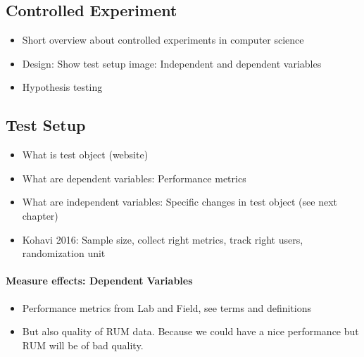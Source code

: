 





\subsection{Controlled Experiment}

\begin{itemize}
\item Short overview about controlled experiments in computer science
\item Design: Show test setup image: Independent and dependent variables
\item Hypothesis testing
\end{itemize}











\subsection{Test Setup}

\begin{itemize}
\item What is test object (website)
\item What are dependent variables: Performance metrics
\item What are independent variables: Specific changes in test object (see next chapter)
\item Kohavi 2016: Sample size, collect right metrics, track right users, randomization unit
\end{itemize}


\paragraph{Measure effects: Dependent Variables}

\begin{itemize}
\item Performance metrics from Lab and Field, see terms and definitions
\item But also quality of RUM data. Because we could have a nice performance but RUM will be of bad quality. 
\end{itemize}



